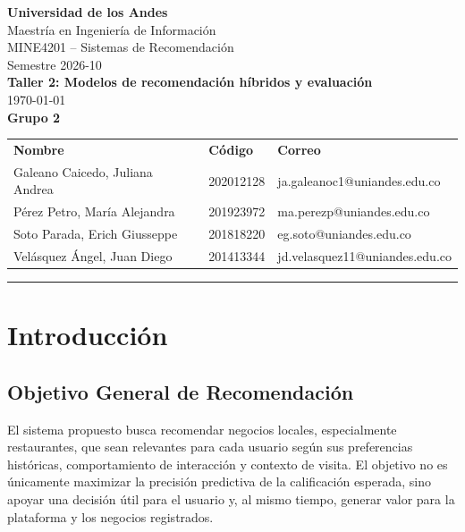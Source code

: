 \documentclass[11pt,a4paper]{article}
\begin{document}
\begin{center}
    {\large \textbf{Universidad de los Andes}} \\[4pt]
    Maestría en Ingeniería de Información \\[2pt]
    MINE4201 -- Sistemas de Recomendación  \\
    Semestre 2026-10 \\[12pt]
    {\LARGE \textbf{Taller 2: Modelos de recomendación híbridos y evaluación}} \\[4pt]
    \today \\[12pt]
    {\textbf{Grupo 2}} \\[1pt]
    \begin{tabular}{lll}
        \textbf{Nombre} & \textbf{Código} & \textbf{Correo} \\[4pt]
        Galeano Caicedo, Juliana Andrea  & 202012128 & ja.galeanoc1@uniandes.edu.co \\
        Pérez Petro, María Alejandra     & 201923972 & ma.perezp@uniandes.edu.co    \\
        Soto Parada, Erich Giusseppe     & 201818220 & eg.soto@uniandes.edu.co      \\
        Velásquez Ángel, Juan Diego      & 201413344 & jd.velasquez11@uniandes.edu.co \\
    \end{tabular}
\end{center}


\tableofcontents 

\vspace{1em}
\hrule
\vspace{1.5em}


\section{Introducción}


\subsection*{Objetivo General de Recomendación}

El sistema propuesto busca recomendar negocios locales, especialmente restaurantes, que sean relevantes para cada usuario según sus preferencias históricas, comportamiento de interacción y contexto de visita. El objetivo no es únicamente maximizar la precisión predictiva de la calificación esperada, sino apoyar una decisión útil para el usuario y, al mismo tiempo, generar valor para la plataforma y los negocios registrados.
\end{document}
